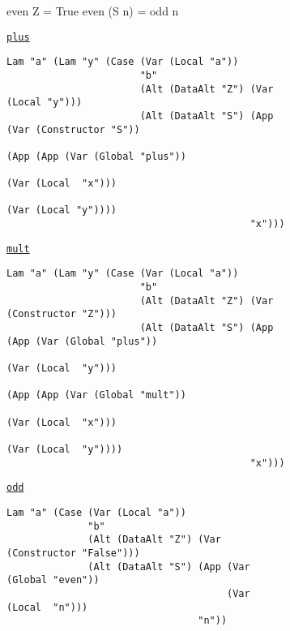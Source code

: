 \begin{figure}
\begin{subfigure}[haskell]{\textwidth}
\begin{haskell}
even    Z  = True
even (S n) = odd n
    \end{haskell}
    \smallskip
  \end{subfigure}
  \begin{subfigure}[plus]{\textwidth}
    \begin{small}
      \underline{\texttt{plus}}
      \begin{verbatim}
Lam "a" (Lam "y" (Case (Var (Local "a"))
                       "b"
                       (Alt (DataAlt "Z") (Var (Local "y")))
                       (Alt (DataAlt "S") (App (Var (Constructor "S"))
                                               (App (App (Var (Global "plus"))
                                                         (Var (Local  "x")))
                                                    (Var (Local "y"))))
                                          "x")))
      \end{verbatim}
    \end{small}
  \end{subfigure}
  \begin{subfigure}[mult]{\textwidth}
    \begin{small}
      \underline{\texttt{mult}}
      \begin{verbatim}
Lam "a" (Lam "y" (Case (Var (Local "a"))
                       "b"
                       (Alt (DataAlt "Z") (Var (Constructor "Z")))
                       (Alt (DataAlt "S") (App (App (Var (Global "plus"))
                                                    (Var (Local  "y")))
                                               (App (App (Var (Global "mult"))
                                                         (Var (Local  "x")))
                                                    (Var (Local  "y"))))
                                          "x")))
      \end{verbatim}
    \end{small}
  \end{subfigure}
  \begin{subfigure}[odd]{\textwidth}
    \begin{small}
      \underline{\texttt{odd}}
      \begin{verbatim}
Lam "a" (Case (Var (Local "a"))
              "b"
              (Alt (DataAlt "Z") (Var (Constructor "False")))
              (Alt (DataAlt "S") (App (Var (Global "even"))
                                      (Var (Local  "n")))
                                 "n"))
      \end{verbatim}
    \end{small}

\end{subfigure}
\end{figure}
